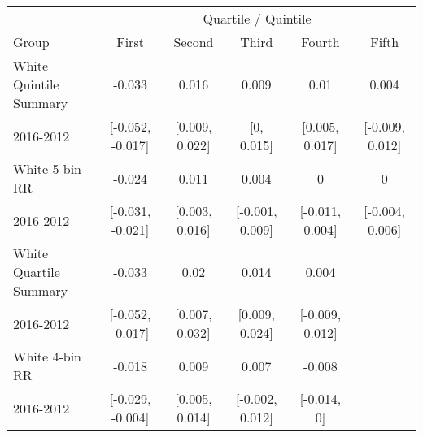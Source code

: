\begin{tabular}{l|ccccc}
\hline\hline
      & \multicolumn{5}{c}{Quartile / Quintile} \\
Group & First & Second & Third & Fourth & Fifth \\
\hline
White Quintile Summary  &  -0.033 & 0.016 & 0.009 & 0.01 & 0.004 \\ 
 2016-2012 & [-0.052, -0.017] & [0.009, 0.022] & [0, 0.015] & [0.005, 0.017] & [-0.009, 0.012] \\ 
 \hline
White 5-bin RR  &  -0.024 & 0.011 & 0.004 & 0 & 0 \\ 
 2016-2012 & [-0.031, -0.021] & [0.003, 0.016] & [-0.001, 0.009] & [-0.011, 0.004] & [-0.004, 0.006] \\ 
 \hline
White Quartile Summary  &  -0.033 & 0.02 & 0.014 & 0.004 \\ 
 2016-2012 & [-0.052, -0.017] & [0.007, 0.032] & [0.009, 0.024] & [-0.009, 0.012] \\ 
 \hline
White 4-bin RR  &  -0.018 & 0.009 & 0.007 & -0.008 \\ 
 2016-2012 & [-0.029, -0.004] & [0.005, 0.014] & [-0.002, 0.012] & [-0.014, 0] \\ 
 \hline
\hline
\end{tabular}
